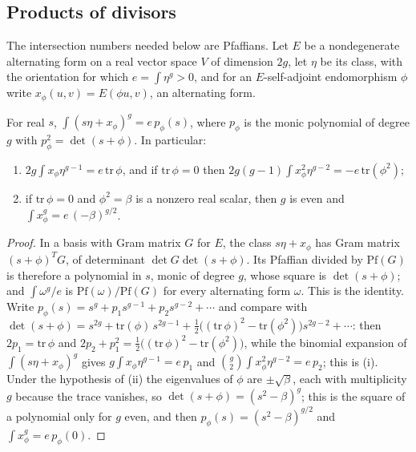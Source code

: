 \subsection{Products of divisors}

The intersection numbers needed below are Pfaffians. Let $E$ be a
nondegenerate alternating form on a real vector space $V$ of dimension $2g$,
let $\eta$ be its class, with the orientation for which
$e=\int\eta^{g}>0$, and for an $E$-self-adjoint endomorphism $\phi$ write
$x_{\phi}(u,v)=E(\phi u,v)$, an alternating form.

\begin{lemma}\label{lem:pfaffian}
For real $s$, $\int(s\eta+x_{\phi})^{g}=e\,p_{\phi}(s)$, where $p_{\phi}$ is
the monic polynomial of degree $g$ with $p_{\phi}^{2}=\det(s+\phi)$. In
particular:
\begin{enumerate}[label=\textup{(\roman*)},nosep]
\item $2g\int x_{\phi}\eta^{g-1}=e\,\mathrm{tr}\,\phi$, and if
  $\mathrm{tr}\,\phi=0$ then
  $2g(g-1)\int x_{\phi}^{2}\eta^{g-2}=-e\,\mathrm{tr}(\phi^{2})$;
\item if $\mathrm{tr}\,\phi=0$ and $\phi^{2}=\beta$ is a nonzero real
  scalar, then $g$ is even and $\int x_{\phi}^{g}=e\,(-\beta)^{g/2}$.
\end{enumerate}
\end{lemma}

\begin{proof}
In a basis with Gram matrix $G$ for $E$, the class $s\eta+x_{\phi}$ has Gram
matrix $(s+\phi)^{T}G$, of determinant $\det G\det(s+\phi)$. Its Pfaffian
divided by $\mathrm{Pf}(G)$ is therefore a polynomial in $s$, monic of degree
$g$, whose square is $\det(s+\phi)$; and $\int\omega^{g}/e$ is
$\mathrm{Pf}(\omega)/\mathrm{Pf}(G)$ for every alternating form $\omega$.
This is the identity. Write $p_{\phi}(s)=s^{g}+p_{1}s^{g-1}+p_{2}s^{g-2}+\cdots$
and compare with
$\det(s+\phi)=s^{2g}+\mathrm{tr}(\phi)\,s^{2g-1}
+\tfrac12\bigl((\mathrm{tr}\,\phi)^{2}-\mathrm{tr}(\phi^{2})\bigr)s^{2g-2}+\cdots$:
then $2p_{1}=\mathrm{tr}\,\phi$ and
$2p_{2}+p_{1}^{2}=\tfrac12\bigl((\mathrm{tr}\,\phi)^{2}-\mathrm{tr}(\phi^{2})\bigr)$,
while the binomial expansion of $\int(s\eta+x_{\phi})^{g}$ gives
$g\int x_{\phi}\eta^{g-1}=e\,p_{1}$ and
$\binom{g}{2}\int x_{\phi}^{2}\eta^{g-2}=e\,p_{2}$; this is (i). Under the
hypothesis of (ii) the eigenvalues of $\phi$ are $\pm\sqrt{\beta}$, each with
multiplicity $g$ because the trace vanishes, so
$\det(s+\phi)=(s^{2}-\beta)^{g}$; this is the square of a polynomial only
for $g$ even, and then $p_{\phi}(s)=(s^{2}-\beta)^{g/2}$ and
$\int x_{\phi}^{g}=e\,p_{\phi}(0)$.
\end{proof}

